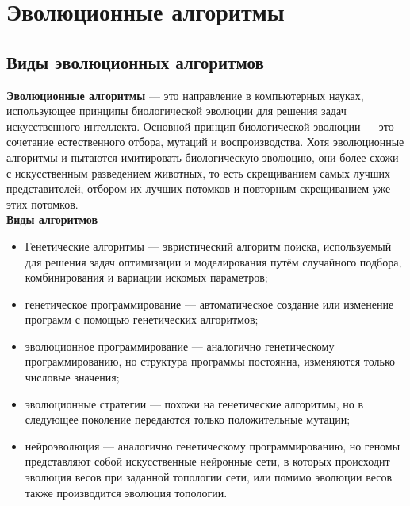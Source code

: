 \newpage

\chapter{Эволюционные алгоритмы}
\section{Виды эволюционных алгоритмов}

\indent \indent \textbf{Эволюционные алгоритмы} — это направление в компьютерных науках, использующее принципы биологической эволюции для решения задач искусственного интеллекта. Основной принцип биологической эволюции — это сочетание естественного отбора, мутаций и воспроизводства. Хотя эволюционные алгоритмы и пытаются имитировать биологическую эволюцию, они более схожи с искусственным разведением животных, то есть скрещиванием самых лучших представителей, отбором их лучших потомков и повторным скрещиванием уже этих потомков. \\

\textbf{Виды алгоритмов}

\begin{itemize}
  \item Генетические алгоритмы — эвристический алгоритм поиска, используемый для решения задач оптимизации и моделирования путём случайного подбора, комбинирования и вариации искомых параметров;
  \item генетическое программирование — автоматическое создание или изменение программ с помощью генетических алгоритмов;
  \item эволюционное программирование — аналогично генетическому программированию, но структура программы постоянна, изменяются только числовые значения;
  \item эволюционные стратегии — похожи на генетические алгоритмы, но в следующее поколение передаются только положительные мутации;
  \item нейроэволюция — аналогично генетическому программированию, но геномы представляют собой искусственные нейронные сети, в которых происходит эволюция весов при заданной топологии сети, или помимо эволюции весов также производится эволюция топологии.
\end{itemize}
